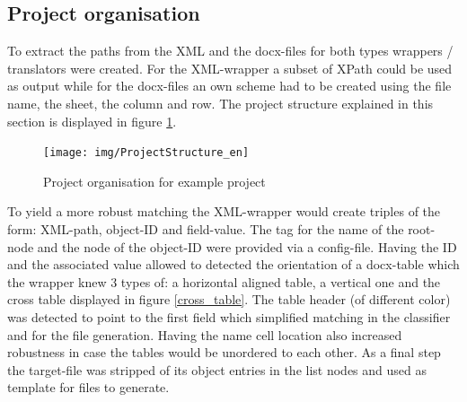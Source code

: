 \documentclass[conference]{IEEEtran}
\begin{document}
\subsection{Project organisation}
To extract the paths from the XML and the docx-files for both types wrappers / translators
were created. For the XML-wrapper a subset of XPath could be used as output while for the
docx-files an own scheme had to be created using the file name, the sheet, the column and
row. The project structure explained in this section is displayed in figure
\ref{project_structure}.
\begin{figure}[h]
 \centering
 \texttt{[image: img/ProjectStructure\_en]}
 \caption{Project organisation for example project}
 \label{project_structure}
\end{figure}
To yield a more robust matching the XML-wrapper would create triples of
the form: XML-path, object-ID and field-value. The tag for the name of the root-node and
the node of the object-ID were provided via a config-file. Having the ID and the associated
value allowed to detected the orientation of a docx-table which the wrapper knew 3 types of:
a horizontal aligned table, a vertical one and the cross table displayed in figure
\ref{cross_table}. The table header (of different color) was detected to point to the first
field which simplified matching in the classifier and for the file generation. Having the
name cell location also increased robustness in case the tables would be unordered to each
other. As a final step the target-file was stripped of its object entries in the list nodes
and used as template for files to generate.
\end{document}
